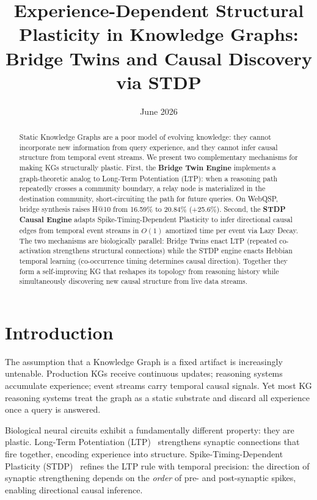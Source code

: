 \documentclass[10pt,twocolumn]{article}
\title{\textbf{Experience-Dependent Structural Plasticity in Knowledge Graphs:\\
Bridge Twins and Causal Discovery via STDP}}
\date{June 2026}
\begin{document}
\maketitle

\begin{abstract}
Static Knowledge Graphs are a poor model of evolving knowledge: they cannot
incorporate new information from query experience, and they cannot infer causal
structure from temporal event streams. We present two complementary mechanisms for
making KGs structurally plastic. First, the \textbf{Bridge Twin Engine} implements a
graph-theoretic analog to Long-Term Potentiation (LTP): when a reasoning path
repeatedly crosses a community boundary, a relay node is materialized in the
destination community, short-circuiting the path for future queries. On WebQSP, bridge
synthesis raises H@10 from 16.59\% to 20.84\% (+25.6\%). Second, the
\textbf{STDP Causal Engine} adapts Spike-Timing-Dependent Plasticity to infer
directional causal edges from temporal event streams in $O(1)$ amortized time per event
via Lazy Decay. The two mechanisms are biologically parallel: Bridge Twins enact LTP
(repeated co-activation strengthens structural connections) while the STDP engine enacts
Hebbian temporal learning (co-occurrence timing determines causal direction).
Together they form a self-improving KG that reshapes its topology from reasoning history
while simultaneously discovering new causal structure from live data streams.
\end{abstract}

\section{Introduction}
\label{sec:intro}

The assumption that a Knowledge Graph is a fixed artifact is increasingly untenable.
Production KGs receive continuous updates; reasoning systems accumulate experience;
event streams carry temporal causal signals. Yet most KG reasoning systems treat the
graph as a static substrate and discard all experience once a query is answered.

Biological neural circuits exhibit a fundamentally different property: they are plastic.
Long-Term Potentiation (LTP)~\cite{hebb1949,bipoo1998} strengthens synaptic connections
that fire together, encoding experience into structure. Spike-Timing-Dependent
Plasticity (STDP)~\cite{markram1997,sjostrom2010} refines the LTP rule with temporal
precision: the direction of synaptic strengthening depends on the \emph{order} of
pre- and post-synaptic spikes, enabling directional causal inference.
\end{document}
